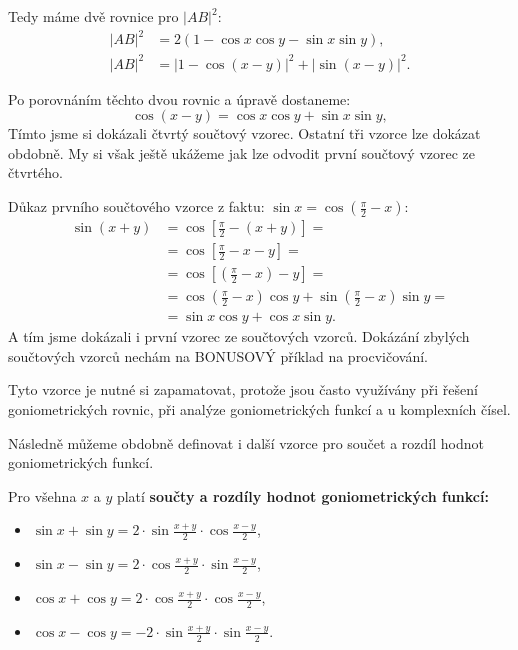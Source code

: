 \documentclass[12pt,a4paper]{article}
\begin{document}
Tedy máme dvě rovnice pro $|AB|^2$:
\[
\begin{aligned}
|AB|^2 &= 2\left(1 - \cos x \cos y - \sin x \sin y\right), \\[0.5em]
|AB|^2 &= |1 - \cos (x-y)|^2 + |\sin (x-y)|^2.
\end{aligned}
\]

Po porovnáním těchto dvou rovnic a úpravě dostaneme:
\[
\cos (x-y) = \cos x \cos y + \sin x \sin y,
\]
Tímto jsme si dokázali čtvrtý součtový vzorec. Ostatní tři vzorce lze dokázat obdobně.
My si však ještě ukážeme jak lze odvodit první součtový vzorec ze čtvrtého.

\medskip
Důkaz prvního součtového vzorce z faktu: $\sin x = \cos \left(\frac{\pi}{2} - x \right)$:
\[
\begin{aligned}
    \sin (x + y)    &= \cos \left[\frac{\pi}{2} - (x + y) \right] = \\[0.5em]
                    &= \cos \left[\frac{\pi}{2} - x - y \right] = \\[0.5em]
                    &= \cos \left[\left(\frac{\pi}{2} - x\right) - y \right] = \\[0.5em]
                    &= \cos \left(\frac{\pi}{2} - x\right) \cos y + \sin \left(\frac{\pi}{2} - x\right) \sin y = \\[0.5em]
                    &= \sin x \cos y + \cos x \sin y.
\end{aligned}
\]
A tím jsme dokázali i první vzorec ze součtových vzorců. Dokázání zbylých součtových vzorců nechám na BONUSOVÝ příklad na procvičování. 

%
%

\begin{notebox}
    Tyto vzorce je nutné si zapamatovat, protože jsou často využívány při řešení goniometrických rovnic,
    při analýze goniometrických funkcí a u komplexních čísel.
\end{notebox}

Následně můžeme obdobně definovat i další vzorce pro součet a rozdíl hodnot goniometrických funkcí.

\begin{definitionbox}
    Pro všehna $x$ a $y$ platí \textbf{součty a rozdíly hodnot goniometrických funkcí:}
    \begin{itemize}
        \item $\sin x + \sin y = 2 \cdot \sin \frac{x+y}{2} \cdot \cos \frac{x-y}{2}$,
        \item $\sin x - \sin y = 2 \cdot \cos \frac{x+y}{2} \cdot \sin \frac{x-y}{2}$,
        \item $\cos x + \cos y = 2 \cdot \cos \frac{x+y}{2} \cdot \cos \frac{x-y}{2}$,
        \item $\cos x - \cos y = -2 \cdot \sin \frac{x+y}{2} \cdot \sin \frac{x-y}{2}$.
    \end{itemize}

\end{definitionbox}
\end{document}
